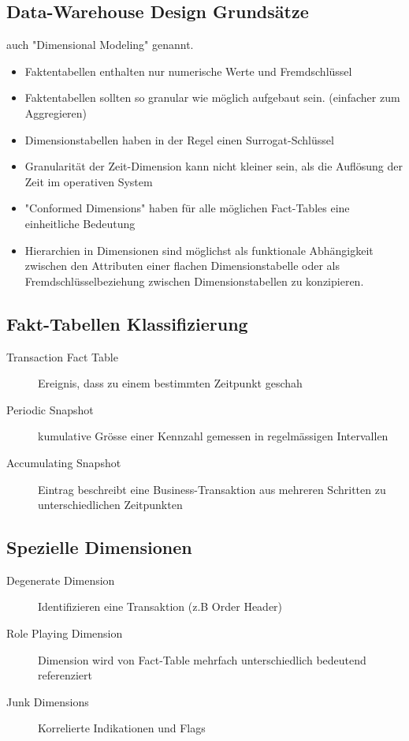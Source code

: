 \documentclass[../Main.tex]{subfiles}
\begin{document}
\subsection{Data-Warehouse Design Grundsätze}
auch "Dimensional Modeling" genannt.
\begin{itemize}
    \item Faktentabellen enthalten nur numerische Werte und Fremdschlüssel
    \item Faktentabellen sollten so granular wie möglich aufgebaut sein. (einfacher zum Aggregieren)
    \item Dimensionstabellen haben in der Regel einen Surrogat-Schlüssel
    \item Granularität der Zeit-Dimension kann nicht kleiner sein, als die Auflösung der Zeit im operativen System
    \item "Conformed Dimensions" haben für alle möglichen Fact-Tables eine einheitliche Bedeutung
    \item Hierarchien in Dimensionen sind möglichst als funktionale Abhängigkeit zwischen den Attributen einer
    flachen Dimensionstabelle oder als Fremdschlüsselbeziehung zwischen Dimensionstabellen zu konzipieren.
\end{itemize}

\subsection{Fakt-Tabellen Klassifizierung}
\begin{description}
    \item[Transaction Fact Table] Ereignis, dass zu einem bestimmten Zeitpunkt geschah
    \item[Periodic Snapshot] kumulative Grösse einer Kennzahl gemessen in regelmässigen Intervallen
    \item[Accumulating Snapshot] Eintrag beschreibt eine Business-Transaktion aus mehreren Schritten zu unterschiedlichen Zeitpunkten   
\end{description}

\subsection{Spezielle Dimensionen}
\begin{description}
    \item[Degenerate Dimension] Identifizieren eine Transaktion (z.B Order Header)
    \item[Role Playing Dimension] Dimension wird von Fact-Table mehrfach unterschiedlich bedeutend referenziert
    \item[Junk Dimensions] Korrelierte Indikationen und Flags 
\end{description}
\end{document}
